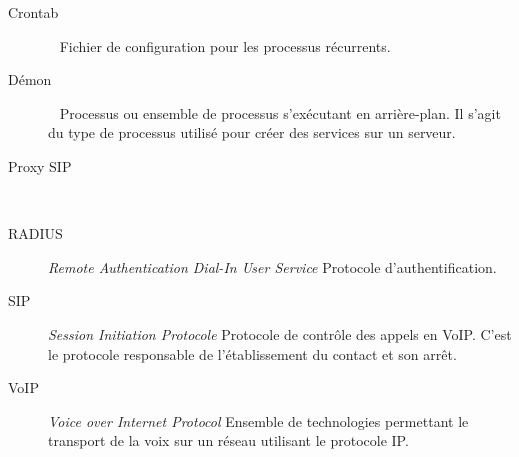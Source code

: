 
\begin{description}
	\item[Crontab] ~ \newline Fichier de configuration pour les processus récurrents.
	\item[Démon]  ~ \newline Processus ou ensemble de processus s’exécutant en arrière-plan. Il s’agit du type de processus utilisé pour créer des services sur un serveur.
	\item[Proxy SIP] ~ \newline \todo
	\item[RADIUS] \textit{Remote Authentication Dial-In User Service} \newline Protocole d’authentification.
	\item[SIP] \textit{Session Initiation Protocole} \newline Protocole de contrôle des appels en VoIP. C’est le protocole responsable de l’établissement du contact et son arrêt.
	\item[VoIP] \textit{Voice over Internet Protocol} \newline Ensemble de technologies permettant le transport de la voix sur un réseau utilisant le protocole IP.
\end{description}

